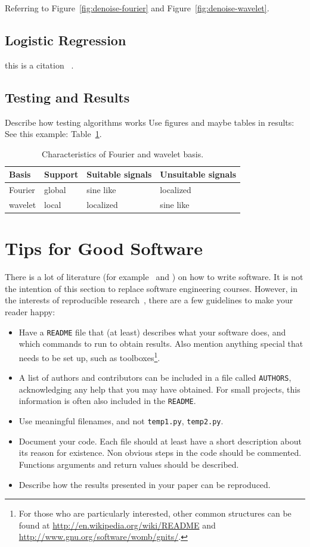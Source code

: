 \documentclass[10pt,conference,compsocconf]{IEEEtran}
\begin{document}
Referring to Figure~\ref{fig:denoise-fourier} and
Figure~\ref{fig:denoise-wavelet}.

\subsection{Logistic Regression}
this is a citation ~\cite{anderson04,wavelab}.


\subsection{Testing and Results}
Describe how testing algorithms works
Use figures and maybe tables in results: See this example: Table~\ref{tab:fourier-wavelet}.

\begin{table}[htbp]
  \centering
  \begin{tabular}[c]{|l||l|l|l|}
    \hline
    Basis&Support&Suitable signals&Unsuitable signals\\
    \hline
    Fourier&global&sine like&localized\\
    wavelet&local&localized&sine like\\
    \hline
  \end{tabular}
  \caption{Characteristics of Fourier and wavelet basis.}
  \label{tab:fourier-wavelet}
\end{table}


\section{Tips for Good Software}
\label{sec:tips-software}

There is a lot of literature (for example~\cite{hunt99pragmatic} and
\cite{spolsky04software}) on how to write software. It is not the
intention of this section to replace software engineering
courses. However, in the interests of reproducible
research~\cite{schwab00}, there are a few guidelines to make your
reader happy:
\begin{itemize}
\item Have a \texttt{README} file that (at least) describes what your
  software does, and which commands to run to obtain results. Also
  mention anything special that needs to be set up, such as
  toolboxes\footnote{For those who are
  particularly interested, other common structures can be found at
  \url{http://en.wikipedia.org/wiki/README} and
  \url{http://www.gnu.org/software/womb/gnits/}.}.
\item A list of authors and contributors can be included in a file
  called \texttt{AUTHORS}, acknowledging any help that you may have
  obtained. For small projects, this information is often also
  included in the \texttt{README}.
\item Use meaningful filenames, and not \texttt{temp1.py},
  \texttt{temp2.py}. 
\item Document your code. Each file should at least have a short
  description about its reason for existence. Non obvious steps in the
  code should be commented. Functions arguments and return values should be described.
\item Describe how the results presented in your paper can be reproduced.
\end{itemize}
\end{document}
